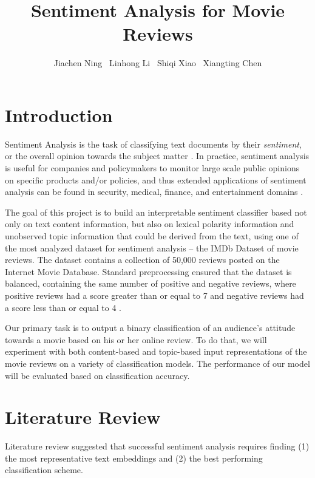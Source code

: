 \documentclass{article}
\title{Sentiment Analysis for Movie Reviews}
\author{%
  Jiachen Ning \ Linhong Li \ Shiqi Xiao \ Xiangting Chen 
}
\begin{document}

\maketitle

\section{Introduction}

Sentiment Analysis is the task of classifying text documents by their {\it sentiment}, or the overall opinion towards the subject matter \cite{Pang}. In practice, sentiment analysis is useful for companies and policymakers to monitor large scale public opinions on specific products and/or policies, and thus extended applications of sentiment analysis can be found in security, medical, finance, and entertainment domains \cite{Mantyl}.

The goal of this project is to build an interpretable sentiment classifier based not only on text content information, but also on lexical polarity information and unobserved topic information that could be derived from the text, using one of the most analyzed dataset for sentiment analysis -- the IMDb Dataset of movie reviews. The dataset contains a collection of 50,000 reviews posted on the Internet Movie Database. Standard preprocessing ensured that the dataset is balanced, containing the same number of positive and negative reviews, where positive reviews had a score greater than or equal to 7 and negative reviews had a score less than or equal to 4 \cite{Mass}. 

Our primary task is to output a binary classification of an audience's attitude towards a movie based on his or her online review. To do that, we will experiment with both content-based and topic-based input representations of the movie reviews on a variety of classification models. The performance of our model will be evaluated based on classification accuracy.



\section{Literature Review}

Literature review suggested that successful sentiment analysis requires finding (1) the most representative text embeddings and (2) the best performing classification scheme. 
\end{document}
